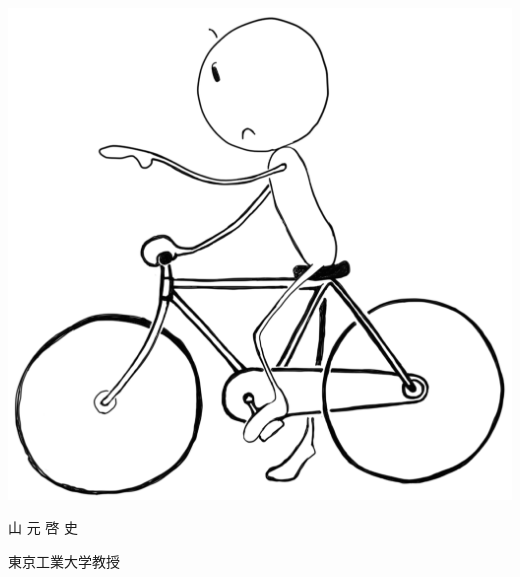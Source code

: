 \documentclass[
uplatex,
b5paper,
10pt,
dvipdfmx
]{jsbook}
\newif\ifEnglish
\begin{document}
\vspace*{1\baselineskip}
\begin{flushright}
 \includegraphics[width=.2\hsize]{bicycle201801.pdf}

 \ifEnglish
 Hilofumi Yamamoto, Ph.\,D.\\
 Professor of Linguistics\\
 Tokyo Institute of Technology\\
 \else
 {\large 山 元 啓 史}\hspace*{3zw}
 
 {\small 東京工業大学教授\hspace*{2zw}}
\fi
\end{flushright}

\end{document}
